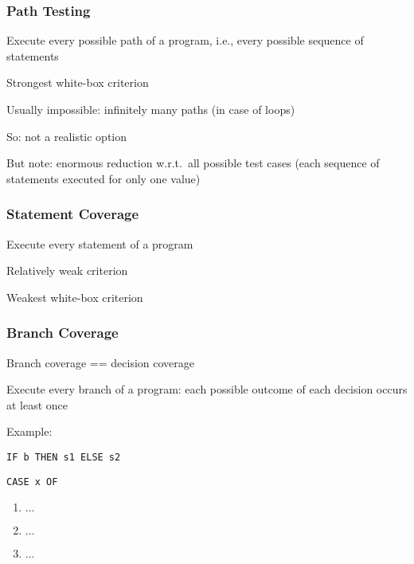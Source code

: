 \subsubsection{Path Testing}

\begin{itemize*}
	\item Execute every possible path of a program, i.e., every possible sequence of statements
	\item Strongest white-box criterion
	\item Usually impossible: infinitely many paths (in case of loops)
	\item So: not a realistic option
	\item But note: enormous reduction w.r.t.\ all possible test cases (each sequence of statements executed for only one value)
\end{itemize*}


\subsubsection{Statement Coverage}

\begin{itemize*}
	\item Execute every statement of a program
	\item Relatively weak criterion
	\item Weakest white-box criterion
\end{itemize*}


\subsubsection{Branch Coverage}

\begin{itemize*}
	\item Branch coverage == decision coverage
	\item Execute every branch of a program: each possible outcome of each decision occurs at least once
	\item Example:
	\begin{itemize*}
		\item \verb|IF b THEN s1 ELSE s2|
		\item \verb|CASE x OF|
		\begin{enumerate}
			\item $\ldots$
			\item $\ldots$
			\item $\ldots$
		\end{enumerate}
	\end{itemize*}
\end{itemize*}

